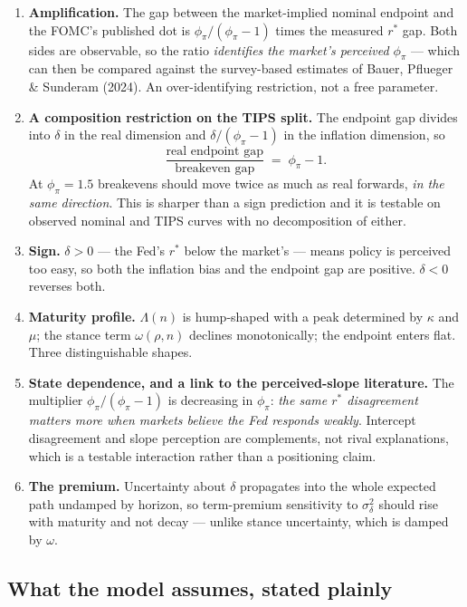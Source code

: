 \begin{enumerate}\setlength\itemsep{0.25em}
\item \textbf{Amplification.} The gap between the market-implied nominal endpoint and the FOMC's
published dot is $\phi_\pi/(\phi_\pi-1)$ times the measured $r^{*}$ gap. Both sides are
observable, so the ratio \emph{identifies the market's perceived $\phi_\pi$} --- which can then
be compared against the survey-based estimates of Bauer, Pflueger \& Sunderam (2024). An
over-identifying restriction, not a free parameter.
\item \textbf{A composition restriction on the TIPS split.} The endpoint gap divides into
$\delta$ in the real dimension and $\delta/(\phi_\pi-1)$ in the inflation dimension, so
\[
\frac{\text{real endpoint gap}}{\text{breakeven gap}} \;=\; \phi_\pi - 1 .
\]
At $\phi_\pi=1.5$ breakevens should move twice as much as real forwards, \emph{in the same
direction}. This is sharper than a sign prediction and it is testable on observed nominal and
TIPS curves with no decomposition of either.
\item \textbf{Sign.} $\delta>0$ --- the Fed's $r^{*}$ below the market's --- means policy is
perceived too easy, so both the inflation bias and the endpoint gap are positive. $\delta<0$
reverses both.
\item \textbf{Maturity profile.} $\Lambda(n)$ is hump-shaped with a peak determined by $\kappa$
and $\mu$; the stance term $\omega(\rho,n)$ declines monotonically; the endpoint enters flat.
Three distinguishable shapes.
\item \textbf{State dependence, and a link to the perceived-slope literature.} The multiplier
$\phi_\pi/(\phi_\pi-1)$ is decreasing in $\phi_\pi$: \emph{the same $r^{*}$ disagreement matters
more when markets believe the Fed responds weakly}. Intercept disagreement and slope perception
are complements, not rival explanations, which is a testable interaction rather than a
positioning claim.
\item \textbf{The premium.} Uncertainty about $\delta$ propagates into the whole expected path
undamped by horizon, so term-premium sensitivity to $\sigma^2_\delta$ should rise with maturity
and not decay --- unlike stance uncertainty, which is damped by $\omega$.
\end{enumerate}

\subsection{What the model assumes, stated plainly}

